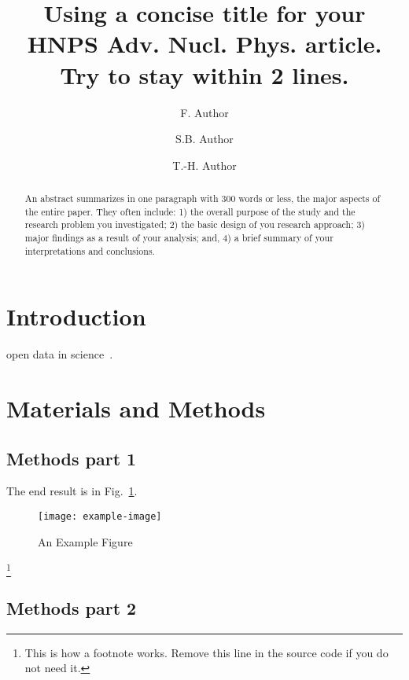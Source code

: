 \documentclass[
  manuscript=article,  %
  layout=publish,  %
  year=20XX,
  volume=XX,
]{extras/hnpsanp}
\title{Using a concise title for your HNPS Adv. Nucl. Phys. article. Try to stay within 2 lines.}
\author{F. Author}
\affiliation{Institution-1, City, Country}
\author{S.B. Author}
\affiliation{Institution-2, City, Country}
\author{T.-H. Author}
\affiliation{Institution-3, City, Country}
\begin{document}
\linenumbers

\begin{abstract}
  An abstract summarizes in one paragraph with 300 words or less, the major aspects of the entire paper. They often include: 1) the overall purpose of the study and the research problem you investigated; 2) the basic design of you research approach; 3) major findings as a result of your analysis; and, 4) a brief summary of your interpretations and conclusions. 
\end{abstract}


\section{Introduction}

\blindtext 
open data in science~\cite{Mavrommatis_Clark_1990}.


\blindtext [2]


\section{Materials and Methods}

\subsection{Methods part 1}

\blindtext The end result is in Fig.~\ref{fig:logo}.

\begin{figure}[ht!]
  \centering
  \texttt{[image: example-image]}
  \caption{An Example Figure}
  \label{fig:logo}
\end{figure}

\blindtext\footnote{This is how a footnote works. Remove this line in the source code if you do not need it.}

\subsection{Methods part 2}
\end{document}
